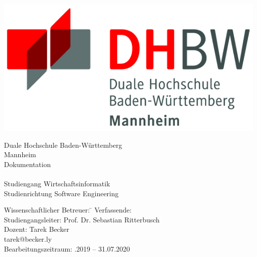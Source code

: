 \begin{titlepage}
\begin{minipage}{\textwidth}
		\vspace{-1cm}
        \begin{center}
            \includegraphics[scale=1.5]{img/logo.jpg}
        \end{center}
\end{minipage}
\vspace{4em}
\sffamily

\begin{center}
	\textsf{\Large{}Duale Hochschule Baden-W\"urttemberg\\[1.5mm] Mannheim}\\[4.5em]
	\textsf{\Large{}Dokumentation}\\[3mm]
	\textsf{\textbf{\Large{}\DerTitelDerArbeit}} \\[2.5cm]
	\textsf{\Large{}Studiengang Wirtschaftsinformatik}\\[3mm] \textsf{Studienrichtung Software Engineering}
	\vspace{2em}
\vfill

\begin{minipage}{\textwidth}

\begin{tabbing}
    Wissenschaftlicher Betreuer: \hspace{0.85cm}\=\kill
	Verfassende: \> \DerAutorDerArbeit \\[2mm]
	Studiengangsleiter: \> Prof. Dr. Sebastian Ritterbusch  \\[2mm]
	Dozent: \> Tarek Becker \\
	\> tarek@becker.ly \\[2mm]
	Bearbeitungszeitraum: .2019 -- 31.07.2020
\end{tabbing}
\end{minipage}

\end{center}
\end{titlepage}